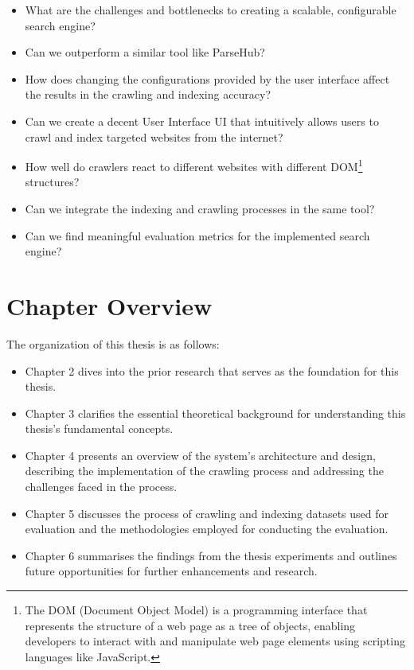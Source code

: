 \begin{itemize}
\setlength{\itemsep}{0pt} %
\setlength{\parskip}{0pt} %
\setlength{\parsep}{0pt} %
\setlength{\topsep}{0pt} %

  \item What are the challenges and bottlenecks to creating a scalable, configurable search engine?
\item Can we outperform a similar tool like ParseHub?
\item How does changing the configurations provided by the user interface affect the results in the crawling and indexing accuracy?
    \item Can we create a decent User Interface UI that intuitively allows users to crawl and index targeted websites from the internet?
\item How well do crawlers react to different websites with different DOM\footnote{The DOM (Document Object Model) is a programming interface that represents the structure of a web page as a tree of objects, enabling developers to interact with and manipulate web page elements using scripting languages like JavaScript.} structures?
    \item Can we integrate the indexing and crawling processes in the same tool?
    \item Can we find meaningful evaluation metrics for the implemented search engine?
\end{itemize}

\section{Chapter Overview}
The organization of this thesis is as follows:

\begin{itemize}
\setlength{\itemsep}{0pt} %
\setlength{\parskip}{0pt} %
\setlength{\parsep}{0pt} %
\setlength{\topsep}{0pt} %

  \item Chapter 2 dives into the prior research that serves as the foundation for this thesis.
  \item Chapter 3 clarifies the essential theoretical background for understanding this thesis's fundamental concepts.
  \item Chapter 4 presents an overview of the system's architecture and design, describing the implementation of the crawling process and addressing the challenges faced in the process.
  \item Chapter 5 discusses the process of crawling and indexing datasets used for evaluation and the methodologies employed for conducting the evaluation.
  \item Chapter 6 summarises the findings from the thesis experiments and outlines future opportunities for further enhancements and research.
\end{itemize}